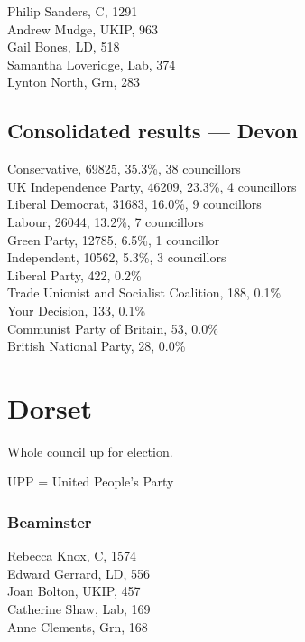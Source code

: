 \documentclass[a4paper,openany,10pt]{book}
\begin{document}


Philip Sanders, C, 1291\\
Andrew Mudge, UKIP, 963\\
Gail Bones, LD, 518\\
Samantha Loveridge, Lab, 374\\
Lynton North, Grn, 283\\




\subsection*{Consolidated results --- Devon}
Conservative, 69825, 35.3\%, 38 councillors\\
UK Independence Party, 46209, 23.3\%, 4 councillors\\
Liberal Democrat, 31683, 16.0\%, 9 councillors\\
Labour, 26044, 13.2\%, 7 councillors\\
Green Party, 12785, 6.5\%, 1 councillor\\
Independent, 10562, 5.3\%, 3 councillors\\
Liberal Party, 422, 0.2\% \\
Trade Unionist and Socialist Coalition, 188, 0.1\% \\
Your Decision, 133, 0.1\% \\
Communist Party of Britain, 53, 0.0\% \\
British National Party, 28, 0.0\% \\


\vfill

\section{Dorset}

Whole council up for election.

UPP = United People's Party



\subsubsection*{Beaminster}



Rebecca Knox, C, 1574\\
Edward Gerrard, LD, 556\\
Joan Bolton, UKIP, 457\\
Catherine Shaw, Lab, 169\\
Anne Clements, Grn, 168\\
\end{document}
